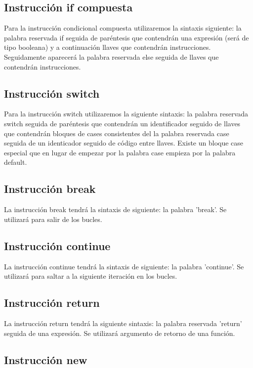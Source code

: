 \documentclass{article}
\begin{document}
\subsection{Instrucción if compuesta}

Para la instrucción condicional compuesta utilizaremos la sintaxis siguiente: la palabra reservada if seguida de paréntesis que contendrán una expresión (será de tipo booleana) y a continuación llaves que contendrán instrucciones. Seguidamente aparecerá la palabra reservada else seguida de llaves que contendrán instrucciones.

\subsection{Instrucción switch\footnotemark[1]}

Para la instrucción switch utilizaremos la siguiente sintaxis: la palabra reservada switch seguida de paréntesis que contendrán un identificador seguido de llaves que contendrán bloques de cases consistentes del la palabra reservada case seguida de un identicador seguido de código entre llaves. Existe un bloque case especial que en lugar de empezar por la palabra case empieza por la palabra default.

\subsection{Instrucción break}

La instrucción break tendrá la sintaxis de siguiente: la palabra 'break'. Se utilizará para salir de los bucles.

\subsection{Instrucción continue}

La instrucción continue tendrá la sintaxis de siguiente: la palabra 'continue'. Se utilizará para saltar a la siguiente iteración en los bucles.

\subsection{Instrucción return}

La instrucción return tendrá la siguiente sintaxis: la palabra reservada 'return' seguida de una expresión. Se utilizará argumento de retorno de una función.

\subsection{Instrucción new\footnotemark[1]}
\end{document}
